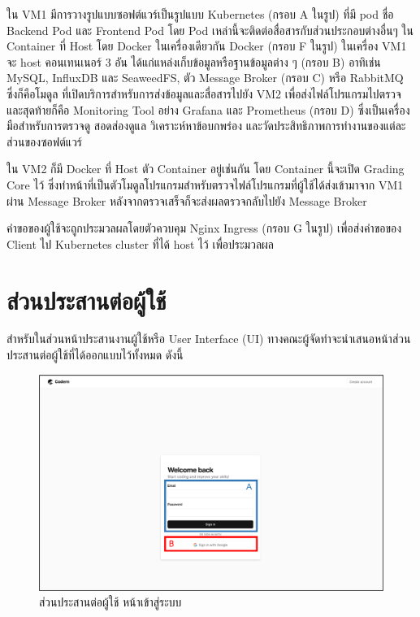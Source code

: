 \documentclass[12pt,one side,openright,a4paper]{cpe-thesis-th}
\newcommand{\thaijustify}[1]{%
  \par\hspace{30pt}\justifying
  #1
}
\begin{document}
    \thaijustify{
        ใน VM1 มีการวางรูปแบบซอฟต์แวร์เป็นรูปแบบ Kubernetes (กรอบ A ในรูป) ที่มี pod ชื่อ Backend Pod และ Frontend Pod โดย Pod เหล่านี้จะติดต่อสื่อสารกับส่วนประกอบต่างอื่นๆ ใน Container ที่ Host โดย Docker ในเครื่องเดียวกัน Docker (กรอบ F ในรูป) ในเครื่อง VM1 จะ host คอนเทนเนอร์ 3 อัน ได้แก่แหล่งเก็บข้อมูลหรือฐานข้อมูลต่าง ๆ (กรอบ B) อาทิเช่น MySQL, InfluxDB และ SeaweedFS, ตัว Message Broker (กรอบ C) หรือ RabbitMQ ซึ่งก็คือโมดูล ที่เปิดบริการสำหรับการส่งข้อมูลและสื่อสารไปยัง VM2 เพื่อส่งไฟล์โปรแกรมไปตรวจ และสุดท้ายก็คือ Monitoring Tool อย่าง Grafana และ Prometheus (กรอบ D) ซึ่งเป็นเครื่องมือสำหรับการตรวจดู สอดส่องดูแล วิเคราะห์หาข้อบกพร่อง และวัดประสิทธิภาพการทำงานของแต่ละส่วนของซอฟต์แวร์
    }
    \thaijustify{ 
        ใน VM2 ก็มี Docker ที่ Host ตัว Container อยู่เช่นกัน โดย Container นี้จะเปิด Grading Core ไว้ ซึ่งทำหน้าที่เป็นตัวโมดูลโปรแกรมสำหรับตรวจไฟล์โปรแกรมที่ผู้ใช้ได้ส่งเข้ามาจาก VM1 ผ่าน Message Broker หลังจากตรวจเสร็จก็จะส่งผลตรวจกลับไปยัง Message Broker
    }
    \thaijustify{
        คำขอของผู้ใช้จะถูกประมวลผลโดยตัวควบคุม Nginx Ingress (กรอบ G ในรูป) เพื่อส่งคำขอของ Client ไป Kubernetes cluster ที่ได้ host ไว้ เพื่อประมวลผล
    }
\pagebreak
\section{ส่วนประสานต่อผู้ใช้}
    \thaijustify{
        สำหรับในส่วนหน้าประสานงานผู้ใช้หรือ User Interface (UI) ทางคณะผู้จัดทำจะนำเสนอหน้าส่วนประสานต่อผู้ใช้ที่ได้ออกแบบไว้ทั้งหมด ดังนี้
    }
    \hypertarget{ui-login}{
        \begin{figure}[H]
        \centering
            \includegraphics[width=15cm]{figure/ui/ui-login1.png}
            \caption[ส่วนประสานต่อผู้ใช้ หน้าเข้าสู่ระบบ]{ส่วนประสานต่อผู้ใช้ หน้าเข้าสู่ระบบ}
            \label{fig:ui-login}
        \end{figure}
    }
    
\end{document}

